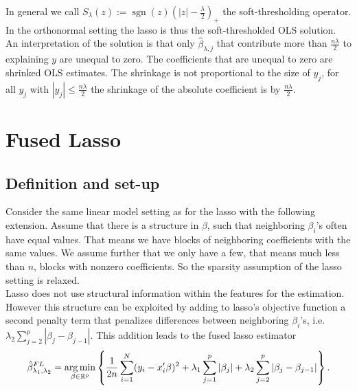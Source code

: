 \documentclass{article}
\theoremstyle{definition}
\DeclareMathOperator*{\argmin}{arg\,min}
\DeclareMathOperator*{\sgn}{sgn}
\begin{document}
\noindent In general we call $S_\lambda(z) := \sgn(z)(|z|-\frac{\lambda}{2})_+$ the soft-thresholding operator. In the orthonormal setting the lasso is thus the soft-thresholded OLS solution.
An interpretation of the solution is that only $\hat\beta_{\lambda,j}$ that contribute more than $\frac{n\lambda}{2}$ to explaining $y$ are unequal to zero. The coefficients that are unequal to zero are shrinked OLS estimates. The shrinkage is not proportional to the size of $y_j$, for all $y_j$ with $|y_j|\leq \frac{n\lambda}{2}$ the shrinkage of the absolute coefficient is by $\frac{n\lambda}{2}$.

\section{Fused Lasso}

\subsection{Definition and set-up}

Consider the same linear model setting as for the lasso with the following extension. Assume that there is a structure in $\beta$, such that neighboring $\beta_i$'s often have equal values. That means we have blocks of neighboring coefficients with the same values. We assume further that we only have a few, that means much less than $n$, blocks with nonzero coefficients. So the sparsity assumption of the lasso setting is relaxed.\\
Lasso does not use structural information within the features for the estimation. However this structure can be exploited by adding to lasso's objective function a second penalty term that penalizes differences between neighboring $\beta_i$'s, i.e. $\lambda_2\sum_{j=2}^p|\beta_j- \beta_{j-1}|$. This addition leads to the fused lasso estimator 
	\begin{equation}\label{eq: fusedlasso}
		\hat{\beta}_{\lambda_1,\lambda_2}^{FL}=\argmin_{\beta \in\rm \mathbb{R}^p} \left\{ \frac{1}{2n}  \sum_{i=1}^{N}(y_{i}-x_{i}'\beta)^2+\lambda_1 \sum_{j=1}^p|\beta_j|+ \lambda_2 \sum_{j=2}^p|\beta_j- \beta_{j-1}| \right \}.
	\end{equation}
\end{document}
